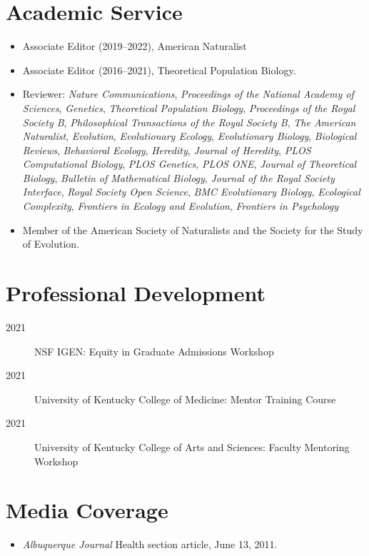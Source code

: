 \documentclass[11pt]{article}
\begin{document}
  \section{Academic Service}
  \begin{itemize}
    \item Associate Editor (2019--2022), American Naturalist
    \item Associate Editor (2016--2021), Theoretical Population Biology.
    \item Reviewer: \textit{Nature Communications}, \textit{Proceedings of the National Academy of Sciences}, \textit{Genetics}, \textit{Theoretical Population Biology}, \textit{Proceedings of the Royal Society B}, \textit{Philosophical Transactions of the Royal Society B}, \textit{The American Naturalist}, \textit{Evolution}, \textit{Evolutionary Ecology}, \textit{Evolutionary Biology}, \textit{Biological Reviews}, \textit{Behavioral Ecology}, \textit{Heredity}, \textit{Journal of Heredity}, \textit{PLOS Computational Biology}, \textit{PLOS Genetics}, \textit{PLOS ONE}, \textit{Journal of Theoretical Biology}, \textit{Bulletin of Mathematical Biology}, \textit{Journal of the Royal Society Interface}, \textit{Royal Society Open Science}, \textit{BMC Evolutionary Biology}, \textit{Ecological Complexity}, \textit{Frontiers in Ecology and Evolution}, \textit{Frontiers in Psychology}
  \item Member of the American Society of Naturalists and the Society for the Study of Evolution.
  \end{itemize}
  

  \section{Professional Development}
  \begin{description}
    \item[2021] NSF IGEN: Equity in Graduate Admissions Workshop
    \item[2021] University of Kentucky College of Medicine: Mentor Training Course
    \item[2021] University of Kentucky College of Arts and Sciences: Faculty Mentoring Workshop
  \end{description}


  \section{Media Coverage}
  \begin{itemize}
  \item \textit{Albuquerque Journal} Health section article, June 13, 2011.
  \end{itemize}

\end{document}
